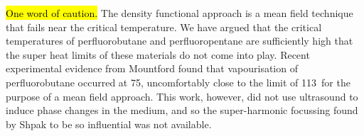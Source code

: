 \hl{One word of caution.}
  The density functional approach is a mean field technique that fails near the critical temperature.
  We have argued that the critical temperatures of perfluorobutane and perfluoropentane are sufficiently high that the super heat limits of these materials do not come into play.
  Recent experimental evidence from  Mountford\cite{Mountford2015} found that vapourisation of perfluorobutane occurred at \unit{75}\degreecelsius, uncomfortably close to the limit of  \unit{113}\degreecelsius\ for the purpose of a mean field approach. 
  This work, however, did not use ultrasound to induce phase changes in the medium, and so the super-harmonic focussing found by Shpak\cite{Shpak2014} to be so influential was not available. 












